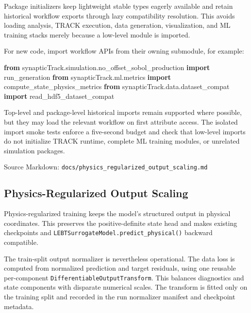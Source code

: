 \documentclass[
]{article}
\newenvironment{Shaded}{}{}
\newcommand{\ImportTok}[1]{\textcolor[rgb]{0.00,0.50,0.00}{\textbf{#1}}}
\newcommand{\NormalTok}[1]{#1}
\begin{document}
Package initializers keep lightweight stable types eagerly available and
retain historical workflow exports through lazy compatibility
resolution. This avoids loading analysis, TRACK execution, data
generation, visualization, and ML training stacks merely because a
low-level module is imported.

For new code, import workflow APIs from their owning submodule, for
example:

\begin{Shaded}
\begin{Highlighting}[]
\ImportTok{from}\NormalTok{ synapticTrack.simulation.no\_offset\_sobol\_production }\ImportTok{import}\NormalTok{ run\_generation}
\ImportTok{from}\NormalTok{ synapticTrack.ml.metrics }\ImportTok{import}\NormalTok{ compute\_state\_physics\_metrics}
\ImportTok{from}\NormalTok{ synapticTrack.data.dataset\_compat }\ImportTok{import}\NormalTok{ read\_hdf5\_dataset\_compat}
\end{Highlighting}
\end{Shaded}

Top-level and package-level historical imports remain supported where
possible, but they may load the relevant workflow on first attribute
access. The isolated import smoke tests enforce a five-second budget and
check that low-level imports do not initialize TRACK runtime, complete
ML training modules, or unrelated simulation packages.

Source Markdown: \texttt{docs/physics\_regularized\_output\_scaling.md}

\hypertarget{physics-regularized-output-scaling}{%
\subsection{Physics-Regularized Output
Scaling}\label{physics-regularized-output-scaling}}

Physics-regularized training keeps the model's structured output in
physical coordinates. This preserves the positive-definite state head
and makes existing checkpoints and
\texttt{LEBTSurrogateModel.predict\_physical()} backward compatible.

The train-split output normalizer is nevertheless operational. The data
loss is computed from normalized prediction and target residuals, using
one reusable per-component \texttt{DifferentiableOutputTransform}. This
balances diagnostics and state components with disparate numerical
scales. The transform is fitted only on the training split and recorded
in the run normalizer manifest and checkpoint metadata.
\end{document}
